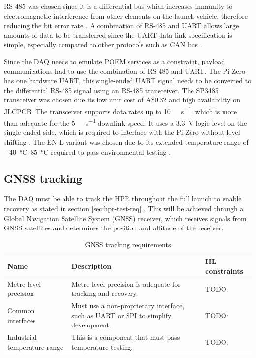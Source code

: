 \documentclass{report}
\newcommand*{\fullref}[1]{\hyperref[{#1}]{\ref*{#1} \nameref*{#1}}}
\newcommand{\aud}{A\$}
\begin{document}
RS-485 was chosen since it is a differential bus which increases immunity to electromagnetic interference from other elements on the launch vehicle, therefore reducing the bit error rate \cite{cratere2024board}. A combination of RS-485 and UART allows large amounts of data to be transferred since the UART data link specification is simple, especially compared to other protocols such as CAN bus \cite{cratere2024board}.

Since the DAQ needs to emulate POEM services as a constraint, payload communications had to use the combination of RS-485 and UART. The Pi Zero has one hardware UART, this single-ended UART signal needs to be converted to the differential RS-485 signal using an RS-485 transceiver. The SP3485 transceiver was chosen due its low unit cost of \aud 0.32 and high availability on JLCPCB. The transceiver supports data rates up to \SI{10}{\mega\bit\per\second}, which is more than adequate for the \SI{5}{\kilo\bit\per\second} downlink speed. It uses a \SI{3.3}{\volt} logic level on the single-ended side, which is required to interface with the Pi Zero without level shifting \cite{maxlinear2021sp3485}. The EN-L variant was chosen due to its extended temperature range of \SIrange{-40}{85}{\degreeCelsius} required to pass environmental testing \cite{maxlinear2021sp3485}.

\subsection{GNSS tracking}

The DAQ must be able to track the HPR throughout the full launch to enable recovery as stated in section \fullref{sec:hpr-test-req}. This will be achieved through a Global Navigation Satellite System (GNSS) receiver, which receives signals from GNSS satellites and determines the position and altitude of the receiver.


\begin{table}[H]
  \centering
  \begin{tabular}{|p{}|p{}|p{}|}
    \hline
    \textbf{Name}                & \textbf{Description}                                                               & \textbf{HL constraints} \\ \hline
    Metre-level precision        & Metre-level precision is adequate for tracking and recovery.                       & TODO:                   \\\hline
    Common interfaces            & Must use a non-proprietary interface, such as UART or SPI to simplify development. & TODO:                   \\\hline
    Industrial temperature range & This is a component that must pass temperature testing.                            & TODO:                   \\\hline
  \end{tabular}
  \caption{GNSS tracking requirements}
  \label{tabl:gnss-requirements}
\end{table}
\end{document}
